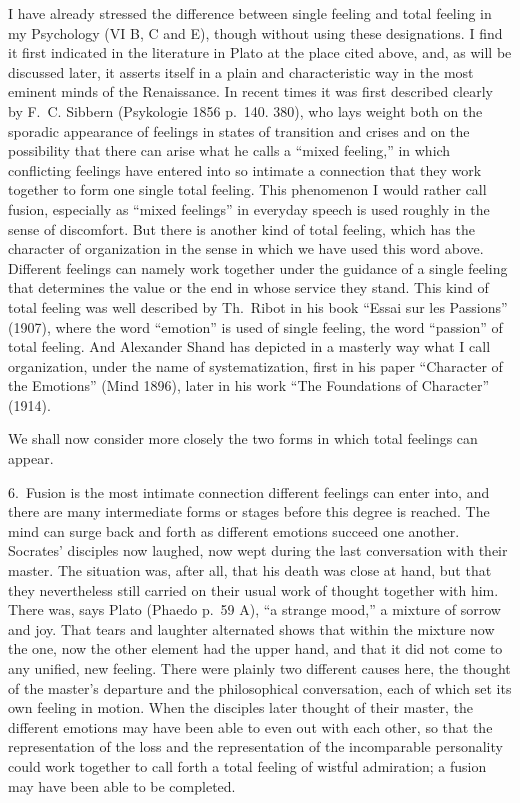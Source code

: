 \documentclass[12pt]{book}
\newcommand{\opage}[1]{\marginnote{\footnotesize\textit{[#1]}}}
\begin{document}
I have already stressed the difference between single feeling and total feeling
in my Psychology (VI B, C and E), though without using these designations. I find
it first indicated in the literature in Plato at the place cited above, and, as
will be discussed later, it asserts itself in a plain and characteristic way in
the most eminent minds of the Renaissance. In recent times it was first described
clearly by F.~C. Sibbern (Psykologie 1856 p.~140. 380), who lays weight both on
the sporadic \opage{26}appearance of feelings in states of transition and crises
and on the possibility that there can arise what he calls a ``mixed feeling,'' in
which conflicting feelings have entered into so intimate a connection that they
work together to form one single total feeling. This phenomenon I would rather
call fusion, especially as ``mixed feelings'' in everyday speech is used roughly
in the sense of discomfort. But there is another kind of total feeling, which has
the character of organization in the sense in which we have used this word above.
Different feelings can namely work together under the guidance of a single
feeling that determines the value or the end in whose service they stand. This
kind of total feeling was well described by Th.~Ribot in his book ``Essai sur les
Passions'' (1907), where the word ``emotion'' is used of single feeling, the word
``passion'' of total feeling. And Alexander Shand has depicted in a masterly way
what I call organization, under the name of systematization, first in his paper
``Character of the Emotions'' (Mind 1896), later in his work ``The Foundations of
Character'' (1914). %

We shall now consider more closely the two forms in which total feelings can
appear.

6.~Fusion is the most intimate connection different feelings can enter into,
and there are many intermediate forms or stages before this degree is reached.
The mind can surge back and forth as different emotions succeed one another.
Socrates' disciples now laughed, now wept during the last conversation with their
master. The situation was, after all, that his death was close at hand, but that
they nevertheless still carried on their usual work of thought together with him.
There was, says Plato (Phaedo p.~59 A), ``a strange mood,'' a mixture of sorrow
and joy. That tears and laughter alternated shows that within the mixture now the
one, now the other element had the upper hand, and that it did not come to any
unified, new feeling. There were plainly two different causes here, the thought
of the master's departure and the philosophical conversation, each of which set
its own feeling in motion. When the disciples later thought of their master, the
different emotions \opage{27}may have been able to even out with each other, so
that the representation of the loss and the representation of the incomparable
personality could work together to call forth a total feeling of wistful
admiration; a fusion may have been able to be completed.
\end{document}

